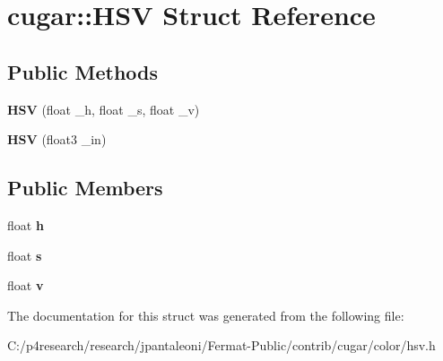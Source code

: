 \hypertarget{structcugar_1_1_h_s_v}{}\section{cugar\+:\+:H\+SV Struct Reference}
\label{structcugar_1_1_h_s_v}
\subsection*{Public Methods}
\begin{DoxyCompactItemize}
\item 
\mbox{\label{structcugar_1_1_h_s_v_a40572eddf0ffc9d4fd2e1bf4836f4e4b}} 
{\bfseries H\+SV} (float \+\_\+h, float \+\_\+s, float \+\_\+v)
\item 
\mbox{\label{structcugar_1_1_h_s_v_a6508c66873631ce3d764eccfc91751b7}} 
{\bfseries H\+SV} (float3 \+\_\+in)
\end{DoxyCompactItemize}
\subsection*{Public Members}
\begin{DoxyCompactItemize}
\item 
\mbox{\label{structcugar_1_1_h_s_v_ae540a47d13236905b3f6dc2c59d084c5}} 
float {\bfseries h}
\item 
\mbox{\label{structcugar_1_1_h_s_v_a68ef52655d47314a0e34958d26187e9a}} 
float {\bfseries s}
\item 
\mbox{\label{structcugar_1_1_h_s_v_a79e7eca2ef3f1c2e7500d26b907215ec}} 
float {\bfseries v}
\end{DoxyCompactItemize}


The documentation for this struct was generated from the following file\+:\begin{DoxyCompactItemize}
\item 
C\+:/p4research/research/jpantaleoni/\+Fermat-\/\+Public/contrib/cugar/color/hsv.\+h\end{DoxyCompactItemize}
